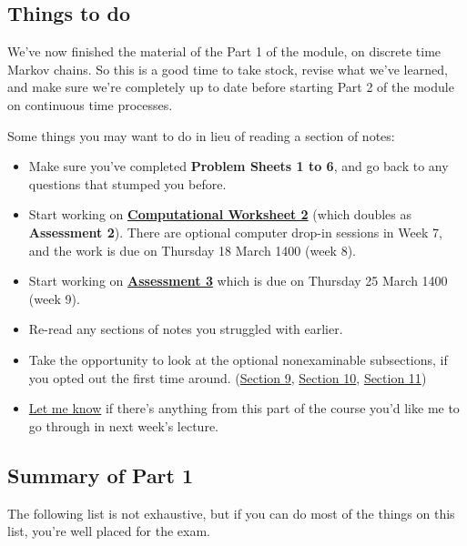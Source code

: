 \documentclass[
  a4paper,
]{article}
\providecommand{\tightlist}{%
  \setlength{\itemsep}{0pt}\setlength{\parskip}{0pt}}
\theoremstyle{definition}
\theoremstyle{definition}
\theoremstyle{definition}
\theoremstyle{remark}
\begin{document}
\hypertarget{todo-revision}{%
\subsection{Things to do}\label{todo-revision}}

We've now finished the material of the Part 1 of the module, on discrete time Markov chains. So this is a good time to take stock, revise what we've learned, and make sure we're completely up to date before starting Part 2 of the module on continuous time processes.

Some things you may want to do in lieu of reading a section of notes:

\begin{itemize}
\tightlist
\item
  Make sure you've completed \textbf{Problem Sheets 1 to 6}, and go back to any questions that stumped you before.
\item
  Start working on \textbf{\protect\hyperlink{computing}{Computational Worksheet 2}} (which doubles as \textbf{Assessment 2}). There are optional computer drop-in sessions in Week 7, and the work is due on Thursday 18 March 1400 (week 8).
\item
  Start working on \textbf{\protect\hyperlink{A3}{Assessment 3}} which is due on Thursday 25 March 1400 (week 9).
\item
  Re-read any sections of notes you struggled with earlier.
\item
  Take the opportunity to look at the optional nonexaminable subsections, if you opted out the first time around. (\protect\hyperlink{S09-strong-markov}{Section 9}, \protect\hyperlink{S10-proof}{Section 10}, \protect\hyperlink{S11-proofs}{Section 11})
\item
  \href{mailto:m.aldridge@leeds.ac.uk}{Let me know} if there's anything from this part of the course you'd like me to go through in next week's lecture.
\end{itemize}

\hypertarget{summary-i}{%
\subsection{Summary of Part 1}\label{summary-i}}

The following list is not exhaustive, but if you can do most of the things on this list, you're well placed for the exam.
\end{document}
